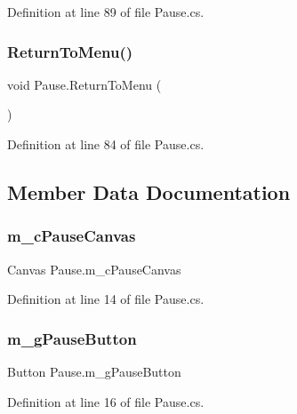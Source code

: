 Definition at line 89 of file Pause.\+cs.

\mbox{\label{class_pause_a5e5184b60b9c781307ba4ab9a9ba4c48}} 
\subsubsection{\texorpdfstring{Return\+To\+Menu()}{ReturnToMenu()}}
{\footnotesize\ttfamily void Pause.\+Return\+To\+Menu (\begin{DoxyParamCaption}{ }\end{DoxyParamCaption})}



Definition at line 84 of file Pause.\+cs.



\subsection{Member Data Documentation}
\mbox{\label{class_pause_a73a822c0f3716f9dca81f1409fe105db}} 
\subsubsection{\texorpdfstring{m\+\_\+c\+Pause\+Canvas}{m\_cPauseCanvas}}
{\footnotesize\ttfamily Canvas Pause.\+m\+\_\+c\+Pause\+Canvas}



Definition at line 14 of file Pause.\+cs.

\mbox{\label{class_pause_ab91ac58302fc8b019555e830e126747f}} 
\subsubsection{\texorpdfstring{m\+\_\+g\+Pause\+Button}{m\_gPauseButton}}
{\footnotesize\ttfamily Button Pause.\+m\+\_\+g\+Pause\+Button}



Definition at line 16 of file Pause.\+cs.

